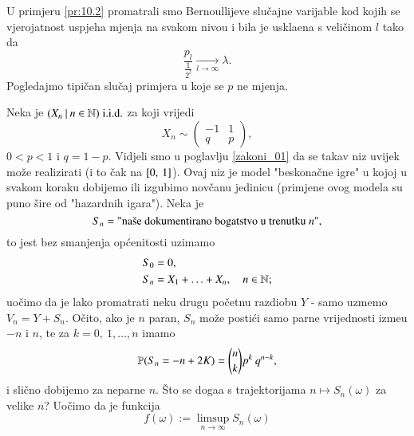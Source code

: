 U primjeru \ref{pr:10.2} promatrali smo Bernoullijeve slu\v cajne varijable kod kojih se vjerojatnost uspjeha mjenja na svakom nivou i bila je uskla\dj ena s veli\v cinom $l$ tako da
\begin{equation*}
    \frac{p_l}{\frac{1}{2^l}} \xrightarrow[l \to \infty]{} \lambda.
\end{equation*}
Pogledajmo tipi\v can slu\v caj primjera u koje se $p$ ne mjenja.

\begin{pr}  \label{pr:10.3}
    Neka je $({X_n} \: | \: {n \in \mathbb{N}}) \; \mathrm{i.i.d.}$ za koji vrijedi
    \begin{equation*}
        X_n \sim
        \begin{pmatrix}
            -1 & 1\\
            q & p
        \end{pmatrix},
    \end{equation*}
    $0 < p < 1$ i $q = 1 - p$. Vidjeli smo u poglavlju \ref{zakoni_01} da se takav niz uvijek mo\v ze realizirati (i to \v cak na $[{0}, \:{1}]$).
    Ovaj niz je model "beskona\v cne igre" u kojoj u svakom koraku dobijemo ili izgubimo nov\v canu jedinicu (primjene ovog modela su puno \v sire od "hazardnih igara").
    Neka je
    \begin{equation*}
        S_n = \textnormal{"na\v se dokumentirano bogatstvo u trenutku $n$"},
    \end{equation*}
    to jest bez smanjenja op\' cenitosti uzimamo
    \begin{equation*}
        \begin{aligned}
            S_0 &= 0,\\
            S_n &= X_1 + \ldots + X_n, \quad n \in \mathbb{N};
        \end{aligned}
    \end{equation*}
    uo\v cimo da je lako promatrati neku drugu po\v cetnu razdiobu $Y$ - samo uzmemo $V_n = Y + S_n$.
    O\v cito, ako je $n$ paran, $S_n$ mo\v ze posti\' ci samo parne vrijednosti izme\dj u $-n$ i $n$, te za $k = 0, \: 1, \ldots, n$ imamo
    \begin{equation*}
        \mathbb{P}({S_n = -n + 2K}) = {n \choose k} p^k \: q^{n - k},
    \end{equation*}
    i sli\v cno dobijemo za neparne $n$.
    \v Sto se doga\dj a s trajektorijama $n \mapsto S_n(\omega)$ za velike $n$?
    Uo\v cimo da je funkcija
    \begin{equation*}
        f(\omega) := \limsup\limits_{n \to \infty} S_n(\omega)    

\end{equation*}
\end{pr}
